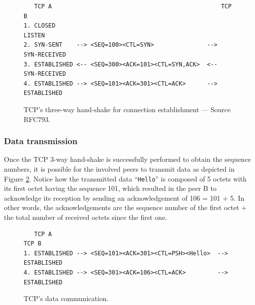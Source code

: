 \documentclass[pdftex,12pt,a4paper]{article}
\begin{document}
                \begin{figure}[tbh]
                        \centering
                        \small\begin{verbatim}   TCP A                                                TCP B
1. CLOSED                                               LISTEN
2. SYN-SENT    --> <SEQ=100><CTL=SYN>               --> SYN-RECEIVED
3. ESTABLISHED <-- <SEQ=300><ACK=101><CTL=SYN,ACK>  <-- SYN-RECEIVED
4. ESTABLISHED --> <SEQ=101><ACK=301><CTL=ACK>      --> ESTABLISHED\end{verbatim}\normalsize
                \vspace{-15pt}
                \caption{TCP's three-way hand-shake for connection
                establishment --- Source RFC793.}
                \label{fig:tcpsyn}
                \end{figure}

            \subsubsection{Data transmission}
                Once the TCP 3-way hand-shake is successfully performed to
                obtain the sequence numbers, it is possible for the involved
                peers to transmit data as depicted in Figure \ref{fig:tcppsh}.
                Notice how the transmitted data ``\texttt{Hello}'' is composed
                of 5 octets with its first octet having the sequence 101, which
                resulted in the peer B to acknowledge its  reception by sending
                an acknowledgement of 106 = 101 + 5. In other words, the
                acknowledgements are the sequence number of the first octet +
                the total number of received octets since the first one.

                \begin{figure}[tbh]
                        \centering
                        \small\begin{verbatim}   TCP A                                                   TCP B
1. ESTABLISHED --> <SEQ=101><ACK=301><CTL=PSH><Hello>  --> ESTABLISHED
4. ESTABLISHED --> <SEQ=301><ACK=106><CTL=ACK>         --> ESTABLISHED\end{verbatim}\normalsize
                \vspace{-15pt}
                \caption{TCP's data communication.}
                \label{fig:tcppsh}
                \end{figure}
\end{document}
